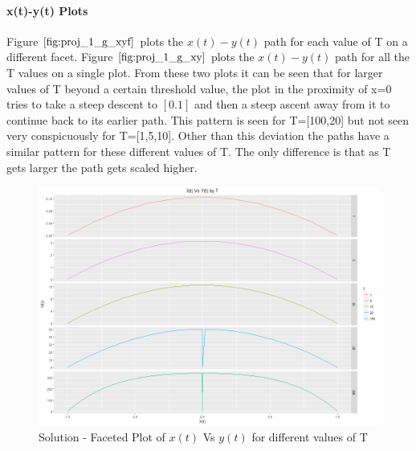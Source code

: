 \documentclass[twoside,12pt]{article}
\begin{document}
\paragraph{x(t)-y(t) Plots}
Figure $\eqref{fig:proj_1_g_xyf}$  plots the $x(t)-y(t)$ path for each value of T on a different facet. Figure $\eqref{fig:proj_1_g_xy}$  plots the $x(t)-y(t)$ path for all the T values on a single plot. From these two plots it can be seen that for larger values of T beyond a certain threshold value, the plot  in the proximity of x=0 tries to take a steep descent to $[0.1]$ and then a steep ascent away from it to continue back to its earlier path. This pattern is seen for T=[100,20] but not seen very conspicuously for T=[1,5,10]. Other than this deviation the paths have a similar pattern for these different values of T. The only difference is that as T gets larger the path gets scaled higher.
{
\begin{figure}[htbp!]
     \begin{center}
            \hspace*{-1.0in}
            \includegraphics[width=1.35\textwidth]{proj_1_g_xyf}
    \end{center}
    \caption{%
     Solution - Faceted Plot of $x(t)$ Vs $y(t)$ for different values of T
     }%
   \label{fig:proj_1_g_xyf}
\end{figure}
}
\end{document}
